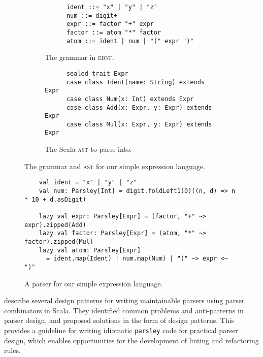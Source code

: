 \documentclass[../../main.tex]{subfiles}
\begin{document}
\begin{figure}[htbp]
  \centering
  \begin{subfigure}{0.6\textwidth}
    \vspace{3ex} %
    \centering
    \begin{verbatim}
      ident ::= "x" | "y" | "z"
      num ::= digit+
      expr ::= factor "+" expr
      factor ::= atom "*" factor
      atom ::= ident | num | "(" expr ")"
    \end{verbatim}
    \caption{The grammar in \textsc{ebnf}.}
    \label{fig:simple-grammar-ebnf}
  \end{subfigure}
  \begin{subfigure}{0.8\textwidth}
    \vspace{5ex} %
    \centering
    \begin{verbatim}
      sealed trait Expr
      case class Ident(name: String) extends Expr
      case class Num(x: Int) extends Expr
      case class Add(x: Expr, y: Expr) extends Expr
      case class Mul(x: Expr, y: Expr) extends Expr
    \end{verbatim}
    \caption{The Scala \textsc{ast} to parse into.}
    \label{fig:simple-grammar-ast}
  \end{subfigure}
  \caption{The grammar and \textsc{ast} for our simple expression language.}
\end{figure}

\begin{figure}[htbp]
  \centering
  \begin{verbatim}
    val ident = "x" | "y" | "z"
    val num: Parsley[Int] = digit.foldLeft1(0)((n, d) => n * 10 + d.asDigit)

    lazy val expr: Parsley[Expr] = (factor, "+" ~> expr).zipped(Add)
    lazy val factor: Parsley[Expr] = (atom, "*" ~> factor).zipped(Mul)
    lazy val atom: Parsley[Expr]
      = ident.map(Ident) | num.map(Num) | "(" ~> expr <~ ")"
  \end{verbatim}
  \caption{A parser for our simple expression language.}
  \label{fig:simple-grammar-parser}
\end{figure}


\textcite{willis_design_2022} describe several design patterns for writing maintainable parsers using parser combinators in Scala.
They identified common problems and anti-patterns in parser design, and proposed solutions in the form of design patterns.
This provides a guideline for writing idiomatic \texttt{parsley} code for practical parser design, which enables opportunities for the development of linting and refactoring rules.
\end{document}
